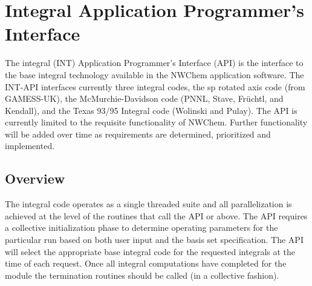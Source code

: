 %
%
% 
% 
\chapter{Integral Application Programmer's Interface} 
The integral (INT) Application Programmer's Interface (API) is the 
interface to the base integral technology available in the NWChem 
application software.  The INT-API interfaces currently three integral 
codes, the sp rotated axis code (from GAMESS-UK), the 
McMurchie-Davidson code (PNNL, Stave, Fr\"uchtl, and Kendall), and the 
Texas 93/95 Integral code (Wolinski and Pulay).  The API is currently 
limited to the requisite functionality of NWChem.  Further 
functionality will be added over time as requirements are determined, 
prioritized and implemented.   
 
\section{Overview} 
The integral code operates as a single threaded suite and all 
parallelization is achieved at the level of the routines that call the 
API or above.  The API requires a collective initialization phase to 
determine operating parameters for the particular run based on both 
user input and the basis set specification.  The API will select the 
appropriate base integral code for the requested integrals at the time 
of each request.  Once all integral computations have completed for 
the module the termination routines should be called (in a collective 
fashion). 
 
